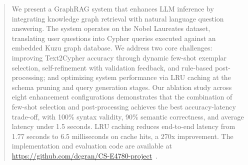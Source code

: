 \documentclass[sigconf]{acmart}
\begin{document}
\begin{abstract}
  We present a GraphRAG system that enhances LLM inference by integrating knowledge graph retrieval with natural language question answering. The system operates on the Nobel Laureates dataset, translating user questions into Cypher queries executed against an embedded Kuzu graph database. We address two core challenges: improving Text2Cypher accuracy through dynamic few-shot exemplar selection, self-refinement with validation feedback, and rule-based post-processing; and optimizing system performance via LRU caching at the schema pruning and query generation stages. Our ablation study across eight enhancement configurations demonstrates that the combination of few-shot selection and post-processing achieves the best accuracy-latency trade-off, with 100\% syntax validity, 90\% semantic correctness, and average latency under 1.5 seconds. LRU caching reduces end-to-end latency from 1.77 seconds to 6.5 milliseconds on cache hits, a 270x improvement. The implementation and evaluation code are available at \url{https://github.com/dcgran/CS-E4780-project}~\cite{CS-E4780-project}.
\end{abstract}


\end{document}
